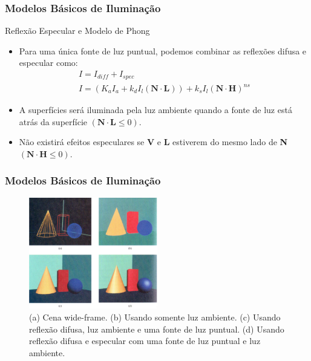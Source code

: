 \documentclass{beamer}
\begin{document}
\begin{frame}
\frametitle{Modelos Básicos de Iluminação}

	\begin{block}{Reflexão Especular e Modelo de Phong}
		\begin{itemize}
			\item<1-> Para uma única fonte de luz puntual, podemos combinar as reflexões difusa e especular como:
			\begin{eqnarray*}
				I = I_{diff} + I_{spec} \\
				I = (K_a I_a + k_d I_l (\textbf{N} \cdot \textbf{L})) + k_s I_l(\textbf{N}  \cdot \textbf{H})^{ns}
			\end{eqnarray*}
			\item<2-> A superfícies será iluminada pela luz ambiente quando a fonte de luz está atrás da superfície $(\textbf{N} \cdot \textbf{L} \leq 0)$.
			\item<3-> Não existirá efeitos especulares se \textbf{V} e \textbf{L} estiverem do mesmo lado de \textbf{N}$(\textbf{N} \cdot \textbf{H} \leq 0)$.
		\end{itemize}
	\end{block}
\end{frame}


\begin{frame}
\frametitle{Modelos Básicos de Iluminação}

	\begin{figure}[!h]
		\begin{center}
		\includegraphics[width=0.5\textwidth]{Figures/AllRef}
		\caption{(a) Cena wide-frame. (b) Usando somente luz ambiente. (c) Usando reflexão difusa, luz ambiente e uma fonte de luz puntual. (d) Usando reflexão difusa e especular com uma fonte de luz puntual e luz ambiente.}
		\end{center}
	\end{figure}	
\end{frame}
\end{document}
